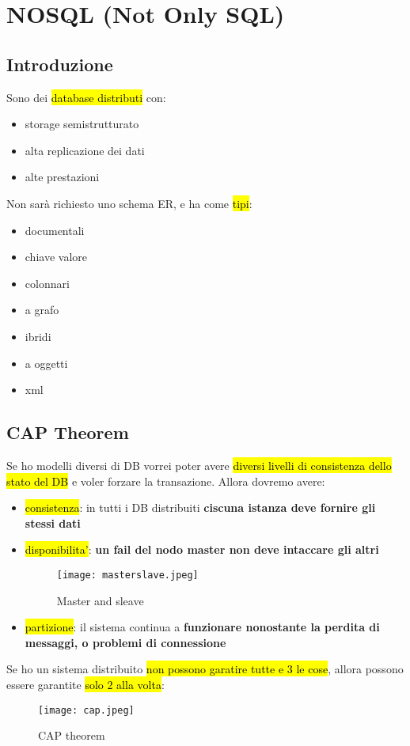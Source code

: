 \newpage
\section{NOSQL (Not Only SQL)}


\subsection{Introduzione}

Sono dei \hl{database distributi} con:

\begin{itemize}
    \item storage semistrutturato
    \item alta replicazione dei dati
    \item alte prestazioni
\end{itemize}

Non sarà richiesto uno schema ER, e ha come \hl{tipi}:

\begin{itemize}
    \item documentali
    \item chiave valore
    \item colonnari
    \item a grafo
    \item ibridi
    \item a oggetti
    \item xml
\end{itemize}


\subsection{CAP Theorem}

Se ho modelli diversi di DB vorrei poter avere \hl{diversi livelli di consistenza dello stato del DB} e voler forzare la transazione. Allora dovremo avere:

\begin{itemize}
    \item \hl{consistenza}: in tutti i DB distribuiti \textbf{ciscuna istanza deve fornire gli stessi dati}
    \item \hl{disponibilita'}: \textbf{un fail del nodo master non deve intaccare gli altri}
    

    \begin{figure}[H]
    \centering
    \texttt{[image: masterslave.jpeg]}
    \caption{Master and sleave} 
    \label{masterslave}
    \end{figure}


    \item \hl{partizione}: il sistema continua a \textbf{funzionare nonostante la perdita di messaggi, o problemi di connessione}
\end{itemize}

Se ho un sistema distribuito \hl{non possono garatire tutte e 3 le cose}, allora possono essere garantite \hl{solo 2 alla volta}:

\begin{figure}[H]
\centering
\texttt{[image: cap.jpeg]}
\caption{CAP theorem} 
\label{cap}
\end{figure}